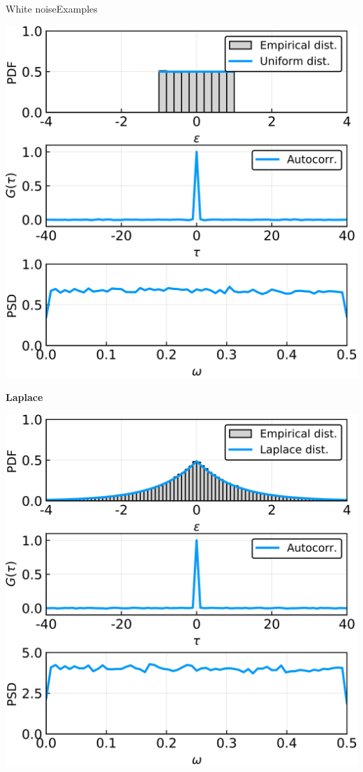 \documentclass[usenames,dvipsnames,svgnames,10pt,aspectratio=169]{beamer}
\begin{document}
\begin{frame}[t, c]{White noise}{Examples}
\begin{minipage}{.32\textwidth}
		\includegraphics[width=\textwidth]{uniform_white_noise_total}
	\end{minipage}%
	\hfill
	\begin{minipage}{.32\textwidth}
		\centering

		\textbf{Laplace}

		\bigskip

		\includegraphics[width=\textwidth]{laplace_white_noise_total}
	\end{minipage}

	\vspace{1cm}
\end{frame}
\end{document}

